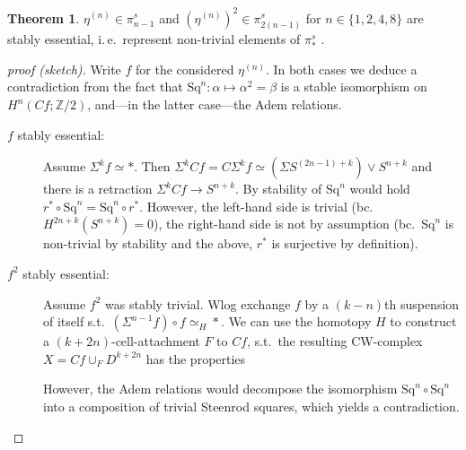 \documentclass[english]{scrartcl}
\theoremstyle{definition}
\newtheorem*{Thm}{Theorem}
\theoremstyle{remark}
\newcommand*{\idest}{i.\,e.\ }
\newcommand*{\Z}{\mathds{Z}}
\newcommand*{\Zmod}{\Z/2}
\newcommand*{\htpic}{\simeq}
\newcommand*{\wedged}{\vee}
\newcommand*{\susp}{\Sigma}  %
\newcommand*{\Sph}[1]{\ensuremath{S^{#1}}} %
\newcommand*{\Sq}{\text{Sq}} %
\begin{document}
\begin{Thm}
  $\eta^{(n)}\in\pi_{n-1}^s$ and $(\eta^{(n)})^2\in\pi_{2(n-1)}^s$ for
  $n\in\{1,2,4,8\}$ are stably essential, \idest represent non-trivial
  elements of $\pi_*^s$
  \cite[see][Prop. 4L.2, 4L.11]{hatcher}.
  \begin{proof}[proof (sketch)]
   Write $f$ for the considered $\eta^{(n)}$.
   In both cases we deduce a contradiction from the fact that
   $\Sq^n\colon \alpha\mapsto \alpha^2=\beta$ is a stable isomorphism
   on $H^n(Cf;\Zmod)$, and---in the latter case---the Adem relations.
   
   \begin{description}
   \item[$f$ stably essential:]
     Assume $\susp^k f\htpic *$.
     Then $\susp^k Cf = C\susp^k f\htpic(\susp\Sph{(2n-1)+k})\wedged\Sph{n+k}$
     and there is a retraction $\susp^k Cf\to\Sph{n+k}$.
     By stability of $\Sq^n$ would hold
     $r^*\circ \Sq^n = \Sq^n\circ r^*$.
     However, the left-hand side is trivial
     (bc.\ $H^{2n+k}(\Sph{n+k})=0$),
     the right-hand side is not by assumption
     (bc.\ $\Sq^n$ is non-trivial by stability and the above,
     $r^*$ is surjective by definition).
   \item[$f^2$ stably essential:]
     Assume $f^2$ was stably trivial. Wlog exchange $f$ by a
     $(k-n)$th suspension of itself s.t.\ $(\susp^{n-1}f)\circ f\htpic_H *$.
     We can use the homotopy $H$ to construct a $(k+2n)$-cell-attachment $F$ to
     $Cf$, s.t.\ the resulting CW-complex $X=Cf\cup_F D^{k+2n}$ has the properties
     However, the Adem relations would decompose the isomorphism
     $\Sq^n\circ\Sq^n$ into a composition of trivial 
     Steenrod squares, which yields a contradiction.\qedhere
   \end{description}
 \end{proof}
\end{Thm}

\nocite{*}
\printbibliography
\end{document}
